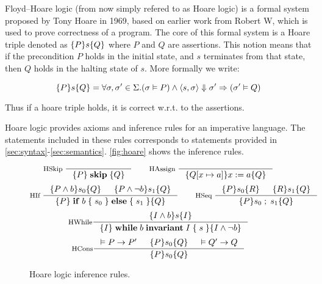 Floyd–Hoare logic (from now simply refered to as Hoare logic) is a formal system proposed by Tony Hoare in 1969,
based on earlier work from Robert W, which is used to prove correctness of a program.
The core of this formal system is a Hoare triple denoted as $\{P\}s\{Q\}$
where $P$ and $Q$ are assertions.
This notion means that if the precondition $P$ holds in the initial state,
and $s$ terminates from that state, then $Q$ holds in the halting state of $s$. More formally we write:

$$\{P\}s\{Q\} = \forall \sigma, \sigma' \in \Sigma. (\sigma \vDash P) \wedge \langle s, \sigma \rangle \Downarrow \sigma' \Rightarrow (\sigma' \vDash Q)$$

Thus if a hoare triple holds, it is correct w.r.t. to the assertions.

Hoare logic provides axioms and inference rules for an imperative language.
The statements included in these rules corresponds to statements provided in \ref{sec:syntax}-\ref{sec:semantics}. \autoref{fig:hoare} shows the inference rules.

\begin{figure}[h!]
\begin{equation*}
\inference[HSkip ]{}
{\hoarePQ{\; \mathbf{skip}\;}}
\qquad
\inference[HAssign ]{}
{\hoare{Q[x \mapsto a]}{x := a}{Q}}
\end{equation*}
\begin{equation*}
\inference[HIf ]{\hoare{P \wedge b}{s_0}{Q} & \hoare{P \wedge \neg b}{s_1}{Q}}
{\hoarePQ{ \; \mathbf{if} \; b \; \{ \; s_0 \; \} \; \mathbf{else} \; \{ \; s_1 \; \} }}
\qquad
\inference[HSeq ]{\hoare{P}{s_0}{R} & \hoare{R}{s_1}{Q}}
{\hoarePQ{s_0 \; ; \; s_1}}
\end{equation*}
\begin{equation*}
\inference[HWhile]{\hoare{I \wedge b}{s}{I}}
{\hoare{I}{ \; \mathbf{while} \; b \; \mathbf{invariant} \; I \; \{ \; s \; \} }{I \wedge \neg b}}
\end{equation*}
\begin{equation*}
\inference[HCons]{\vDash P \rightarrow P' & \hoare{P}{s_0}{Q} & \vDash Q' \rightarrow Q}
{\hoarePQ{s_0}}
\end{equation*}
\caption{Hoare logic inference rules.}
\label{fig:hoare}
\end{figure}

